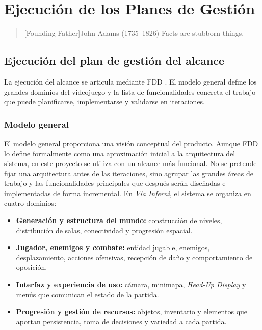 \chapter{Ejecución de los Planes de Gestión}

\begin{quotation}[Founding Father]{John Adams (1735--1826)}
Facts are stubborn things.
\end{quotation}

\begin{abstract}
Este capítulo describe cómo los planes de gestión definidos previamente se trasladan a la
ejecución del proyecto. Su finalidad no es redefinir la planificación, sino explicar cómo se
aplican sus mecanismos de control durante el desarrollo de \textit{Via Inferni}.
\end{abstract}

\section{Ejecución del plan de gestión del alcance}
La ejecución del alcance se articula mediante FDD \cite{palmer2002fdd}. El modelo general
define los grandes dominios del videojuego y la lista de funcionalidades concreta el trabajo
que puede planificarse, implementarse y validarse en iteraciones.

\subsection{Modelo general}
El modelo general proporciona una visión conceptual del producto. Aunque FDD lo define
formalmente como una aproximación inicial a la arquitectura del sistema, en este proyecto se
utiliza con un alcance más funcional. No se pretende fijar una arquitectura antes de las
iteraciones, sino agrupar las grandes áreas de trabajo y las funcionalidades principales que
después serán diseñadas e implementadas de forma incremental. En \textit{Via Inferni}, el
sistema se organiza en cuatro dominios:

\begin{itemize}
    \item \textbf{Generación y estructura del mundo:} construcción de niveles, distribución
    de salas, conectividad y progresión espacial.
    \item \textbf{Jugador, enemigos y combate:} entidad jugable, enemigos, desplazamiento,
    acciones ofensivas, recepción de daño y comportamiento de oposición.
    \item \textbf{Interfaz y experiencia de uso:} cámara, minimapa, \textit{Head-Up Display}
    y menús que comunican el estado de la partida.
    \item \textbf{Progresión y gestión de recursos:} objetos, inventario y elementos que
    aportan persistencia, toma de decisiones y variedad a cada partida.
\end{itemize}

